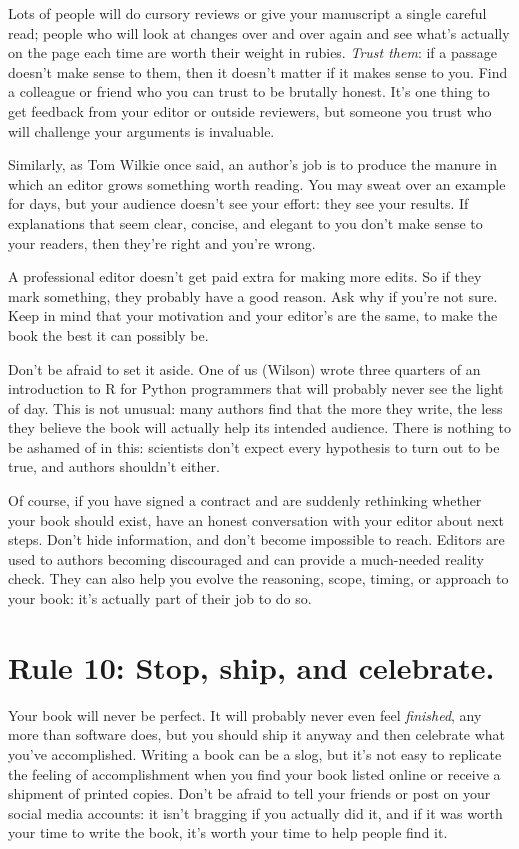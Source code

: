\documentclass[10pt,letterpaper]{article}
\begin{document}
Lots of people will do cursory reviews or give your manuscript a single
careful read; people who will look at changes over and over again and
see what's actually on the page each time are worth their weight in
rubies. \emph{Trust them}: if a passage doesn't make sense to them, then
it doesn't matter if it makes sense to you. Find a colleague or friend
who you can trust to be brutally honest. It's one thing to get feedback
from your editor or outside reviewers, but someone you trust who will
challenge your arguments is invaluable.

Similarly, as Tom Wilkie once said, an author's job is to produce the
manure in which an editor grows something worth reading. You may sweat
over an example for days, but your audience doesn't see your effort:
they see your results. If explanations that seem clear, concise, and
elegant to you don't make sense to your readers, then they're right and
you're wrong.

A professional editor doesn't get paid extra for making more edits. So
if they mark something, they probably have a good reason. Ask why if
you're not sure. Keep in mind that your motivation and your editor's are
the same, to make the book the best it can possibly be.

Don't be afraid to set it aside. One of us (Wilson) wrote three quarters
of an introduction to R for Python programmers that will probably never
see the light of day. This is not unusual: many authors find that the
more they write, the less they believe the book will actually help its
intended audience. There is nothing to be ashamed of in this: scientists
don't expect every hypothesis to turn out to be true, and authors
shouldn't either.

Of course, if you have signed a contract and are suddenly rethinking
whether your book should exist, have an honest conversation with your
editor about next steps. Don't hide information, and don't become
impossible to reach. Editors are used to authors becoming discouraged
and can provide a much-needed reality check. They can also help you
evolve the reasoning, scope, timing, or approach to your book: it's
actually part of their job to do so.

\section*{Rule 10: Stop, ship, and celebrate.}

Your book will never be perfect. It will probably never even feel
\emph{finished}, any more than software does, but you should ship it
anyway and then celebrate what you've accomplished. Writing a book can
be a slog, but it's not easy to replicate the feeling of accomplishment
when you find your book listed online or receive a shipment of printed
copies. Don't be afraid to tell your friends or post on your social
media accounts: it isn't bragging if you actually did it, and if it was
worth your time to write the book, it's worth your time to help people
find it.



\end{document}
